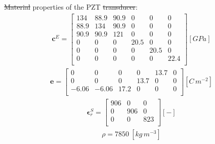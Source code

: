 \documentclass[materials,article,submit,moreauthors,pdftex]{Definitions/mdpi}
\providecommand{\DIFadd}[1]{{\protect\color{blue}{#1}}} %
\providecommand{\DIFdel}[1]{{\protect\color{red}\sout{#1}}}                      %
\providecommand{\DIFaddbegin}{} %
\providecommand{\DIFaddend}{} %
\providecommand{\DIFdelbegin}{} %
\providecommand{\DIFdelend}{} %
\begin{document}
\DIFdelbegin \DIFdel{Material }\DIFdelend \DIFaddbegin \DIFadd{Mechanical and piezoelectric }\DIFaddend properties of the PZT \DIFdelbegin \DIFdel{transducer}\DIFdelend \DIFaddbegin \DIFadd{transducers are}\DIFaddend :
\begin{eqnarray}
\textbf{c}^E=\left [ 
\begin{array}{cccccc}
134 & 88.9 & 90.9 & 0 & 0 & 0 \\ 
88.9 & 134 & 90.9 & 0 & 0 & 0 \\
90.9 & 90.9 & 121 & 0 & 0 & 0 \\
0 & 0 & 0 & 20.5 & 0 & 0 \\
0 & 0 & 0 & 0 & 20.5 & 0 \\
0 & 0 & 0 & 0 & 0 & 22.4 \nonumber \\
\end{array}
\right ] \left [ GPa \right ]
\end{eqnarray}
\begin{eqnarray}
\textbf{e}=\left[
\begin{array}{cccccc}
0 & 0 & 0 & 0 & 13.7 & 0\\
0 & 0 & 0 & 13.7 & 0 & 0\\
-6.06 & -6.06 & 17.2 & 0 & 0 & 0\nonumber \\
\end{array}
\right] \left[C\,m^{-2}\right]
\end{eqnarray}
\begin{eqnarray}
\boldsymbol{\epsilon}^S_r=\left[
\begin{array}{ccc}
906 & 0 & 0\\
0 & 906 & 0\\
0 & 0 & 823\nonumber \\
\end{array}
\right] \left[ - \right]
\end{eqnarray}
\begin{eqnarray}
\rho=7850\ [kg\,m^{-3}] \nonumber
\end{eqnarray}


{}
\end{document}
